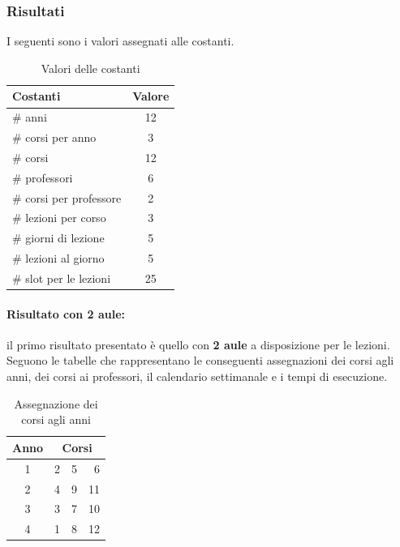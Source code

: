 \documentclass[a4paper,oneside,12pt]{book}
\begin{document}
    \subsubsection*{Risultati}
    I seguenti sono i valori assegnati alle costanti.
    \begin{table}[h]
        \centering
        \begin{tabular}{|l | c |}
            \hline
            Costanti &Valore\\ %
            \hline
            \# anni &12\\
            \# corsi per anno &3\\
            \# corsi &12\\
            \# professori &6\\
            \# corsi per professore &2\\
            \# lezioni per corso &3\\
            \# giorni di lezione &5\\
            \# lezioni al giorno &5\\
            \# slot per le lezioni &25\\
            \hline
        \end{tabular}
        \caption{Valori delle costanti}
    \end{table}

    \FloatBarrier
    \paragraph{Risultato con 2 aule:}il primo risultato presentato è quello con \textbf{2 aule} a disposizione per le lezioni. Seguono le tabelle che rappresentano le conseguenti assegnazioni dei corsi agli anni, dei corsi ai professori,  il calendario settimanale e i tempi di esecuzione.
    \begin{table}[h]
        \centering
        \begin{tabular}{|c | r r r|}
            \hline
            Anno &\multicolumn{3}{c|}{Corsi}\\ %
            \hline
            1 &2&5&6\\
            2 &4&9&11\\
            3 &3&7&10\\
            4 &1&8&12\\



            \hline
        \end{tabular}
        \caption{Assegnazione dei corsi agli anni}
    \end{table}
\end{document}
